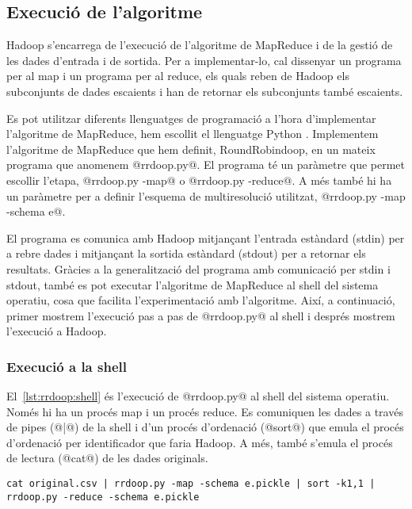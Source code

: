 \subsection{Execució de l'algoritme}


Hadoop s'encarrega de l'execució de l'algoritme de MapReduce i de la
gestió de les dades d'entrada i de sortida.  Per a implementar-lo, cal
dissenyar un programa per al map i un programa per al reduce, els
quals reben de Hadoop els subconjunts de dades escaients i han de
retornar els subconjunts també escaients.  

Es pot utilitzar diferents llenguatges de programació a l'hora
d'implementar l'algoritme de MapReduce, hem escollit el llenguatge
Python \parencite{python:doc2}.  Implementem l'algoritme de MapReduce
que hem definit, RoundRobindoop, en un mateix programa que anomenem
@rrdoop.py@. El programa té un paràmetre que permet escollir l'etapa,
@rrdoop.py -map@ o @rrdoop.py -reduce@. A més també hi ha un paràmetre
per a definir l'esquema de multiresolució utilitzat, %
@rrdoop.py -map -schema e@.

El programa es comunica amb Hadoop mitjançant l'entrada estàndard
(stdin) per a rebre dades i mitjançant la sortida estàndard (stdout)
per a retornar els resultats.  Gràcies a la generalització del
programa amb comunicació per stdin i stdout, també es pot executar
l'algoritme de MapReduce al shell del sistema operatiu, cosa que
facilita l'experimentació amb l'algoritme.  Així, a continuació,
primer mostrem l'execució pas a pas de @rrdoop.py@ al shell i després
mostrem l'execució a Hadoop.



\subsubsection{Execució a la shell}

El~\autoref{lst:rrdoop:shell} és l'execució de
@rrdoop.py@ al shell del sistema operatiu. Només hi ha un procés map i
un procés reduce. Es comuniquen les dades a través de pipes (@|@) de la
shell i d'un procés d'ordenació (@sort@) que emula el procés
d'ordenació per identificador que faria Hadoop. A més, també s'emula
el procés de lectura (@cat@) de les dades originals.

\begin{lstlisting}[style=sh,caption=Execució a la shell de
  rrdoop.py,label=lst:rrdoop:shell]
cat original.csv | rrdoop.py -map -schema e.pickle | sort -k1,1 | rrdoop.py -reduce -schema e.pickle
\end{lstlisting}


